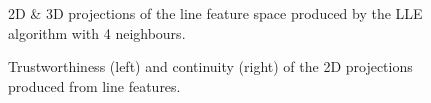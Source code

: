 \begin{figure}[H]
	\centering
	\caption{2D \& 3D projections of the line feature space produced by the LLE algorithm with 4 neighbours.}\label{fig:line_LLE_mapping}
\end{figure}
\clearpage

\clearpage
\begin{figure}[H]
	\centering
	\caption{Trustworthiness (left) and continuity (right) of the 2D projections produced from line features.}\label{fig:TC_2d_lines}
\end{figure}


